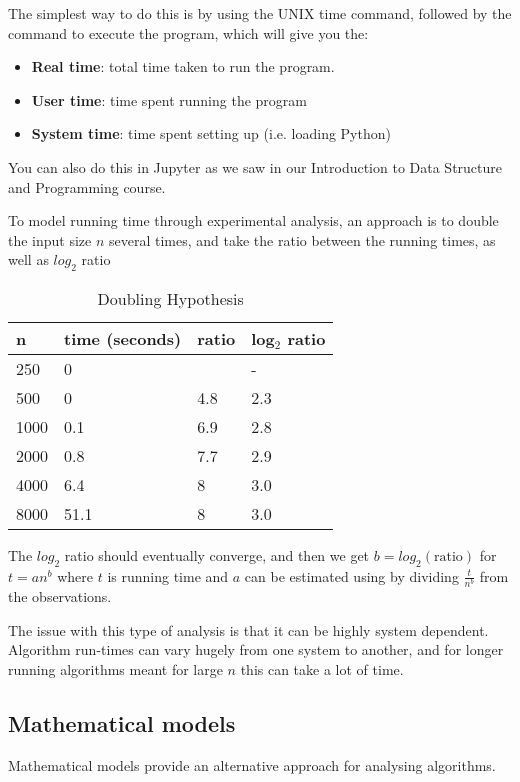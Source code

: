 \documentclass{article}
\begin{document}
The simplest way to do this is by using the UNIX time command, followed by the command to execute the program, which will give you the:
\begin{itemize}
 \item \textbf{Real time}: total time taken to run the program.
 \item \textbf{User time}: time spent running the program
 \item \textbf{System time}: time spent setting up (i.e. loading Python)
\end{itemize}

You can also do this in Jupyter as we saw in our Introduction to Data Structure and Programming course.

To model running time through experimental analysis, an approach is to double the input size $n$ several times, and take the ratio between the running times, as well as $log_2$ ratio

\begin{table}[h]
\centering
\begin{tabular}{|l|l|l|l|}
\hline
n & time (seconds) & ratio & log$_2$ ratio \\ \hline
250 & 0 &  & - \\ \hline
500 & 0 & 4.8 & 2.3 \\ \hline
1000 & 0.1 & 6.9 & 2.8 \\ \hline
2000 & 0.8 & 7.7 & 2.9 \\ \hline
4000 & 6.4 & 8 & 3.0 \\ \hline
8000 & 51.1 & 8 & 3.0 \\ \hline
\end{tabular}
\caption{Doubling Hypothesis}
\label{Doubling Hypothesis}
\end{table}

The $log_2$ ratio should eventually converge, and then we get $b=log_2(\text{ratio})$ for $t=an^b$ where $t$ is running time and $a$ can be estimated using by dividing $\frac {t} {n^b}$ from the observations.

The issue with this type of analysis is that it can be highly system dependent. Algorithm run-times can vary hugely from one system to another, and for longer running algorithms meant for large $n$ this can take a lot of time.

\subsection{Mathematical models}

Mathematical models provide an alternative approach for analysing algorithms. 
\end{document}
